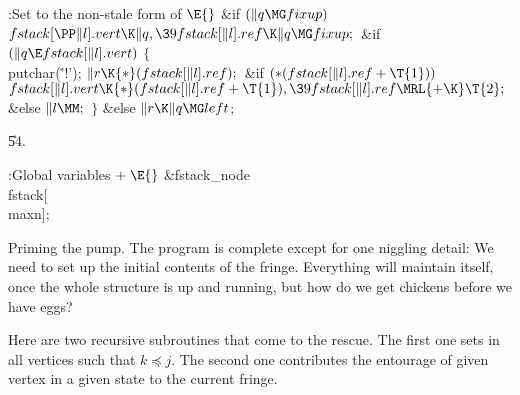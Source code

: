 \B{}:Set  to the non-stale form of \X${}\E{}$\6
\&{if} ${}(\|q\MG\\{fixup}){}$\1\5
${}\\{fstack}[\PP\|l].\\{vert}\K\|q,\39\\{fstack}[\|l].\\{ref}\K\|q\MG%
\\{fixup};{}$\2\6
\&{if} ${}(\|q\E\\{fstack}[\|l].\\{vert}){}$\5
${}\{{}$\1\6
\\{putchar}(\.{'!'});\6
${}\|r\K{*}(\\{fstack}[\|l].\\{ref});{}$\6
\&{if} ${}({*}(\\{fstack}[\|l].\\{ref}+\T{1})){}$\1\5
${}\\{fstack}[\|l].\\{vert}\K{*}(\\{fstack}[\|l].\\{ref}+\T{1}),\39\\{fstack}[%
\|l].\\{ref}\MRL{+{\K}}\T{2};{}$\2\6
\&{else}\1\5
${}\|l\MM;{}$\2\6
\4${}\}{}$\5
\2\&{else}\1\5
${}\|r\K\|q\MG\\{left}{}$;\2\par
\U54.\fi

\B{}:Global variables\X${}\mathrel+\E{}$\6
\&{fstack\_node} \\{fstack}[\\{maxn}];\par
\fi

Priming the pump. The program is complete except for
one niggling
detail: We need to set up the initial contents of the fringe.
Everything will maintain itself, once the whole structure is up and running,
but how do we get chickens before we have eggs?

Here are two recursive subroutines that come to the rescue. The
first one sets  in all vertices 
such that $k\preceq j$.
The second one contributes the entourage of given vertex in a given state to
the current fringe.

